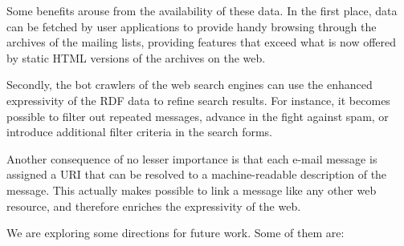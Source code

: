 \documentclass{llncs}
\begin{document}
Some benefits arouse from the availability of these data. In the first
place, data can be fetched by user applications to provide handy browsing
through the archives of the mailing lists, providing features that
exceed what is now offered by static HTML versions of the archives on
the web.

Secondly, the bot crawlers of the web search engines can use the enhanced
expressivity of the RDF data to refine search results. For instance, it
becomes possible to filter out repeated messages, advance in the fight against
spam, or introduce additional filter criteria in the search forms.

Another consequence of no lesser importance is that each e-mail message
is assigned a URI that can be resolved to a machine-readable description
of the message. This actually makes possible to link a message like
any other web resource, and therefore enriches the expressivity of the
web.

We are exploring some directions for future work. Some of them are:
\end{document}
